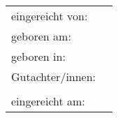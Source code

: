 {\begin{titlepage}
		\vfill
{}
		{\large \raggedleft
			\begin{tabularx}{\textwidth}{l@{\,\,\raggedright~}L} %
				eingereicht von: & \@titelAutor\\
				geboren am: & {\@titelGeburtsdatum}\\
				geboren in: & \@titelGeburtsort
				\vspace{0.5\baselineskip}\\
				Gutachter/innen: & \@titelGutachterA \\
					& \@titelGutachterB
				\vspace{0.5\baselineskip}\\
				eingereicht am: & \@titelEinreichungsdatum \hfill \@titelVerteidigungsdatum
			\end{tabularx}}
			\vspace{-1\baselineskip}\\\phantom{x} %
		\setlength{\parindent}{\parindentbak}
		\setlength{\parskip}{\parskipbak}
	\end{titlepage}

	\let\@titelTitel\undefined
	\let\titel\undefined
	\let\@titelArbeit\undefined
	\let\typ\undefined
	\let\@titelGrad\undefined
	\let\grad\undefined
	\let\@titelAutor\undefined
	\let\autor\undefined
	\let\@titelGeburtsdatum\undefined
	\let\gebdatum\undefined
	\let\@titelGeburtsort\undefined
	\let\gebort\undefined
	\let\@titelGutachterA\undefined
	\let\@titelGutachterB\undefined
	\let\gutachter\undefined
	\let\@titelEinreichungsdatum\undefined
	\let\einreichungsdatum\undefined
	\let\@titelVerteidigungsdatum\undefined
	\let\verteidigungsdatum\undefined

	\KOMAoptions{\@wastwoside}%
	\let\@wastwoside\undefined
	\cleardoublepage %
}


